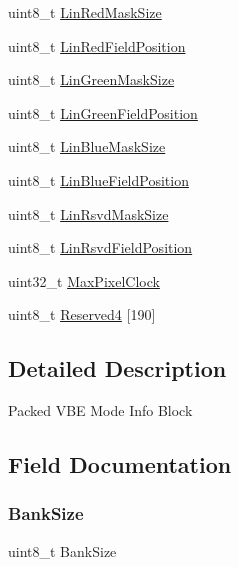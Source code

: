 \begin{DoxyCompactItemize}
\item 
uint8\+\_\+t \hyperlink{struct____attribute_____a1fbcef2402fe6ce7f6c006bd50eaa6da}{Lin\+Red\+Mask\+Size}
\item 
uint8\+\_\+t \hyperlink{struct____attribute_____aff962b58f86a77f12b412d47125a4993}{Lin\+Red\+Field\+Position}
\item 
uint8\+\_\+t \hyperlink{struct____attribute_____af235e505028771ab2fb84778f4dfb476}{Lin\+Green\+Mask\+Size}
\item 
uint8\+\_\+t \hyperlink{struct____attribute_____a6683a63711dbc5dfb9a2a59c55deecd5}{Lin\+Green\+Field\+Position}
\item 
uint8\+\_\+t \hyperlink{struct____attribute_____ad8a25cec803bf91fb40a20a0aa5d5bf7}{Lin\+Blue\+Mask\+Size}
\item 
uint8\+\_\+t \hyperlink{struct____attribute_____a3f38d6becbe961786cd7ab58ec37fc07}{Lin\+Blue\+Field\+Position}
\item 
uint8\+\_\+t \hyperlink{struct____attribute_____a334886fc9a915ff91966c3aac1da586a}{Lin\+Rsvd\+Mask\+Size}
\item 
uint8\+\_\+t \hyperlink{struct____attribute_____a3df070e698b5f54814e20c8813f7bf7e}{Lin\+Rsvd\+Field\+Position}
\item 
uint32\+\_\+t \hyperlink{struct____attribute_____ab1fbd72846963ebb34a308a7edf7bbe1}{Max\+Pixel\+Clock}
\item 
uint8\+\_\+t \hyperlink{struct____attribute_____a2e13c4795a00241b919aa3aab86560ce}{Reserved4} \mbox{[}190\mbox{]}
\end{DoxyCompactItemize}


\subsection{Detailed Description}
Packed V\+BE Mode Info Block 

\subsection{Field Documentation}
\mbox{\label{struct____attribute_____a7e31ea09e6e6755e3a504b9c76b3f545}} 
\subsubsection{\texorpdfstring{Bank\+Size}{BankSize}}
{\footnotesize\ttfamily uint8\+\_\+t Bank\+Size}



